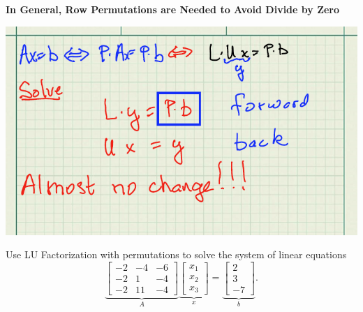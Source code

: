 \documentclass[letterpaper]{book}
\begin{document}
\begin{center}
{\bf \Large In General, Row Permutations are Needed to Avoid Divide by Zero}

\includegraphics[width=0.9\columnwidth]{graphics/Summary/PeelingTheOnionPart04.png}

\end{center}

\begin{example}
\label{ex:SolveUsingLu01WithPerm} 
Use LU Factorization with permutations to solve the system of linear equations
\begin{equation}
    \label{eq:Chap5pt4AwithPerm}
\underbrace{\left[\begin{array}{rrr} -2 & -4 & -6\\
-2 & 1 & -4 \\ -2 & 11 & -4 \end{array}\right]}_{A}  \underbrace{\left[\begin{array}{r} x_1\\
x_2 \\ x_3\end{array}\right]}_{x} 
= \underbrace{\left[\begin{array}{r} 2\\
3 \\ -7 \end{array}\right]}_{b}. 
\end{equation}
\end{example}
\end{document}
